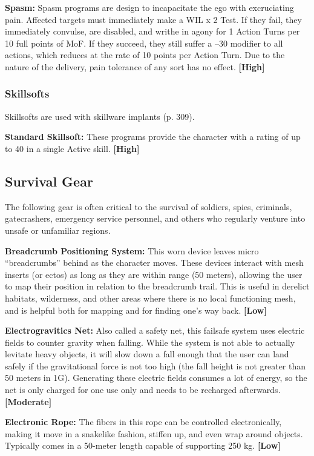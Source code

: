 \textbf{Spasm:} Spasm programs are design to incapacitate 
the ego with excruciating pain. Affected targets must 
immediately make a WIL x 2 Test. If they fail, they 
immediately convulse, are disabled, and writhe in 
agony for 1 Action Turns per 10 full points of MoF. 
If they succeed, they still suffer a –30 modifier to all 
actions, which reduces at the rate of 10 points per 
Action Turn. Due to the nature of the delivery, pain 
tolerance of any sort has no effect. \textbf{[High]}

\subsubsection{Skillsofts}

Skillsofts are used with skillware implants (p. 309).

\textbf{Standard Skillsoft:} These programs provide the 
character with a rating of up to 40 in a single Active 
skill. \textbf{[High]}

\subsection{Survival Gear}

The following gear is often critical to the survival of 
soldiers, spies, criminals, gatecrashers, emergency service
personnel, and others who regularly venture into
unsafe or unfamiliar regions.

\textbf{Breadcrumb Positioning System: }This worn device 
leaves micro ``breadcrumbs'' behind as the character 
moves. These devices interact with mesh inserts (or 
ectos) as long as they are within range (50 meters), 
allowing the user to map their position in relation to 
the breadcrumb trail. This is useful in derelict habitats, 
wilderness, and other areas where there is no local 
functioning mesh, and is helpful both for mapping 
and for finding one's way back. \textbf{[Low]}

\textbf{Electrogravitics Net:} Also called a safety net, this failsafe
system uses electric fields to counter gravity when
falling. While the system is not able to actually levitate 
heavy objects, it will slow down a fall enough that the 
user can land safely if the gravitational force is not too 
high (the fall height is not greater than 50 meters in 
1G). Generating these electric fields consumes a lot of 
energy, so the net is only charged for one use only and 
needs to be recharged afterwards. \textbf{[Moderate]}

\textbf{Electronic Rope:} The fibers in this rope can be 
controlled electronically, making it move in a snakelike
fashion, stiffen up, and
even wrap around objects. 
Typically comes in a 50-meter
length capable of
supporting 250 kg. \textbf{[Low]}

